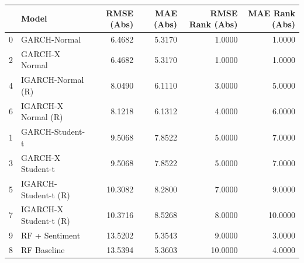 \begin{table}[htbp]
\centering
\begin{tabular}{llrrrr}
\toprule
 & Model & RMSE (Abs) & MAE (Abs) & RMSE Rank (Abs) & MAE Rank (Abs) \\
\midrule
0 & GARCH-Normal & 6.4682 & 5.3170 & 1.0000 & 1.0000 \\
2 & GARCH-X Normal & 6.4682 & 5.3170 & 1.0000 & 1.0000 \\
4 & IGARCH-Normal (R) & 8.0490 & 6.1110 & 3.0000 & 5.0000 \\
6 & IGARCH-X Normal (R) & 8.1218 & 6.1312 & 4.0000 & 6.0000 \\
1 & GARCH-Student-t & 9.5068 & 7.8522 & 5.0000 & 7.0000 \\
3 & GARCH-X Student-t & 9.5068 & 7.8522 & 5.0000 & 7.0000 \\
5 & IGARCH-Student-t (R) & 10.3082 & 8.2800 & 7.0000 & 9.0000 \\
7 & IGARCH-X Student-t (R) & 10.3716 & 8.5268 & 8.0000 & 10.0000 \\
9 & RF + Sentiment & 13.5202 & 5.3543 & 9.0000 & 3.0000 \\
8 & RF Baseline & 13.5394 & 5.3603 & 10.0000 & 4.0000 \\
\bottomrule
\end{tabular}
\label{tab:robustness_absolute_returns}
\end{table}
